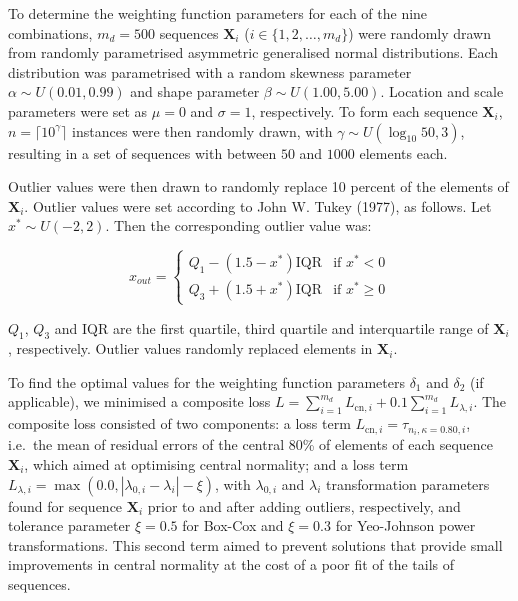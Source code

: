 \documentclass[
  a4paper,
]{article}
\begin{document}
To determine the weighting function parameters for each of the nine
combinations, \(m_d=500\) sequences \(\mathbf{X}_i\)
(\(i \in \{1, 2, \ldots, m_d\}\)) were randomly drawn from randomly
parametrised asymmetric generalised normal distributions. Each
distribution was parametrised with a random skewness parameter
\(\alpha \sim U\left(0.01, 0.99\right)\) and shape parameter
\(\beta \sim U\left(1.00, 5.00 \right)\). Location and scale parameters
were set as \(\mu = 0\) and \(\sigma = 1\), respectively. To form each
sequence \(\mathbf{X}_i\), \(n = \lceil 10^\gamma \rceil\) instances
were then randomly drawn, with
\(\gamma \sim U\left(\log_{10}50, 3\right)\), resulting in a set of
sequences with between \(50\) and \(1000\) elements each.

Outlier values were then drawn to randomly replace 10 percent of the
elements of \(\mathbf{X}_i\). Outlier values were set according to John
W. Tukey (1977), as follows. Let \(x^{*} \sim U\left(-2, 2\right)\).
Then the corresponding outlier value was:

\begin{equation}
x_{out} =
\begin{cases}
Q_1 - \left(1.5 - x^{*} \right) \text{IQR} & \text{if } x^{*} < 0 \\
Q_3 + \left(1.5 + x^{*} \right) \text{IQR} & \text{if } x^{*} \geq 0
\end{cases}
\end{equation}

\(Q_1\), \(Q_3\) and \(\text{IQR}\) are the first quartile, third
quartile and interquartile range of \(\mathbf{X}_i\), respectively.
Outlier values randomly replaced elements in \(\mathbf{X}_i\).

To find the optimal values for the weighting function parameters
\(\delta_1\) and \(\delta_2\) (if applicable), we minimised a composite
loss
\(L = \sum_{i=1}^{m_d} L_{\text{cn},i} + 0.1 \sum_{i=1}^{m_d} L_{\lambda,i}\).
The composite loss consisted of two components: a loss term
\(L_{\text{cn},i} = \tau_{n_i, \kappa = 0.80,i}\), i.e.~the mean of
residual errors of the central 80\% of elements of each sequence
\(\mathbf{X}_i\), which aimed at optimising central normality; and a
loss term
\(L_{\lambda,i} = \max\left(0.0,|\lambda_{0,i} - \lambda_{i}| - \xi \right)\),
with \(\lambda_{0,i}\) and \(\lambda_{i}\) transformation parameters
found for sequence \(\mathbf{X}_i\) prior to and after adding outliers,
respectively, and tolerance parameter \(\xi = 0.5\) for Box-Cox and
\(\xi = 0.3\) for Yeo-Johnson power transformations. This second term
aimed to prevent solutions that provide small improvements in central
normality at the cost of a poor fit of the tails of sequences.
\end{document}
